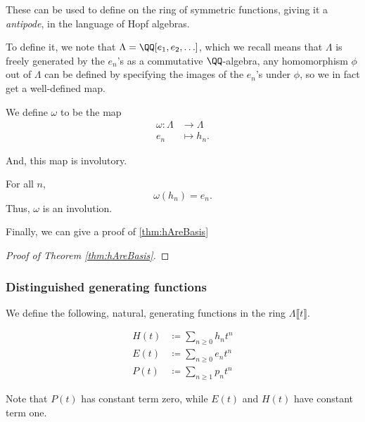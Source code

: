 \documentclass{article}
\newcommand{\pring}[2]{#1 [ {#2} ]}
\begin{document}
These can be used to define  on the ring of symmetric functions, giving it a \textit{antipode}, in the language of Hopf algebras.

To define it, we note that $\Lambda = \pring{\QQ}{e_1,e_2,\ldots}$, which we recall means that $\Lambda$ is freely generated by the $e_n$'s as a commutative $\QQ$-algebra, any homomorphism $\phi$ out of $\Lambda$ can be defined by specifying the images of the $e_n$'s under $\phi$, so we in fact get a well-defined map.

\begin{definition}
    We define $\omega$ to be the map 
    \begin{align*}
        \omega: \Lambda &\to \Lambda \\
        e_n &\mapsto h_n.
    \end{align*}
\end{definition}

And, this map is involutory.

\begin{theorem}
    \label{thm:OmegaIsInvolution}
    For all $n$,
    \[
        \omega(h_n) = e_n.
    \]
    Thus, $\omega$ is an involution.
\end{theorem}

Finally, we can give a proof of \ref{thm:hAreBasis}

\begin{proof}
    [Proof of Theorem \ref{thm:hAreBasis}]

\end{proof}

\subsubsection{Distinguished generating functions}

We define the following, natural, generating functions in the ring $\Lambda \lBrack t \rBrack$.

\begin{definition}
    \begin{align*}
        H(t) &\coloneq \sum_{n\geq0}h_n t^n \\
        E(t) &\coloneq \sum_{n\geq0}e_n t^n \\
        P(t) &\coloneq \sum_{n\geq1}p_n t^n
    \end{align*}
\end{definition}

Note that $P(t)$ has constant term zero, while $E(t)$ and $H(t)$ have constant term one.
\end{document}
